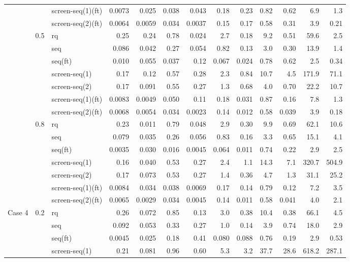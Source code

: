 \begin{longtable}{lllrrrrrrrrrr}
 &  & screen-seq(1)(ft) & 0.0073 & 0.025 & 0.038 & 0.043 & 0.18 & 0.23 & 0.82 & 0.62 & 6.9 & 1.3\\
 &  & screen-seq(2)(ft) & 0.0064 & 0.0059 & 0.034 & 0.0037 & 0.15 & 0.17 & 0.58 & 0.31 & 3.9 & 0.21\\
\midrule
 & 0.5 & rq & 0.25 & 0.24 & 0.78 & 0.024 & 2.7 & 0.18 & 9.2 & 0.51 & 59.6 & 2.5\\
 &  & seq & 0.086 & 0.042 & 0.27 & 0.054 & 0.82 & 0.13 & 3.0 & 0.30 & 13.9 & 1.4\\
 &  & seq(ft) & 0.010 & 0.055 & 0.037 & 0.12 & 0.067 & 0.024 & 0.78 & 0.62 & 2.5 & 0.34\\
 &  & screen-seq(1) & 0.17 & 0.12 & 0.57 & 0.28 & 2.3 & 0.84 & 10.7 & 4.5 & 171.9 & 71.1\\
 &  & screen-seq(2) & 0.17 & 0.091 & 0.55 & 0.27 & 1.3 & 0.68 & 4.0 & 0.70 & 22.2 & 10.7\\
 &  & screen-seq(1)(ft) & 0.0083 & 0.0049 & 0.050 & 0.11 & 0.18 & 0.031 & 0.87 & 0.16 & 7.8 & 1.3\\
 &  & screen-seq(2)(ft) & 0.0068 & 0.0054 & 0.034 & 0.0023 & 0.14 & 0.012 & 0.58 & 0.039 & 3.9 & 0.18\\
\midrule
 & 0.8 & rq & 0.23 & 0.011 & 0.79 & 0.048 & 2.9 & 0.30 & 9.9 & 0.69 & 62.1 & 10.6\\
 &  & seq & 0.079 & 0.035 & 0.26 & 0.056 & 0.83 & 0.16 & 3.3 & 0.65 & 15.1 & 4.1\\
 &  & seq(ft) & 0.0035 & 0.030 & 0.016 & 0.0045 & 0.064 & 0.011 & 0.74 & 0.22 & 2.9 & 2.5\\
 &  & screen-seq(1) & 0.16 & 0.040 & 0.53 & 0.27 & 2.4 & 1.1 & 14.3 & 7.1 & 320.7 & 504.9\\
 &  & screen-seq(2) & 0.17 & 0.073 & 0.53 & 0.27 & 1.4 & 0.36 & 4.7 & 1.3 & 31.1 & 25.2\\
 &  & screen-seq(1)(ft) & 0.0084 & 0.034 & 0.038 & 0.0069 & 0.17 & 0.14 & 0.79 & 0.12 & 7.2 & 3.5\\
 &  & screen-seq(2)(ft) & 0.0065 & 0.0029 & 0.034 & 0.0045 & 0.14 & 0.011 & 0.58 & 0.041 & 4.0 & 2.1\\
\midrule
Case 4 & 0.2 & rq & 0.26 & 0.072 & 0.85 & 0.13 & 3.0 & 0.38 & 10.4 & 0.38 & 66.1 & 4.5\\
 &  & seq & 0.092 & 0.053 & 0.33 & 0.27 & 1.0 & 0.14 & 3.9 & 0.74 & 18.0 & 2.9\\
 &  & seq(ft) & 0.0045 & 0.025 & 0.18 & 0.41 & 0.080 & 0.088 & 0.76 & 0.19 & 2.9 & 0.53\\
 &  & screen-seq(1) & 0.21 & 0.081 & 0.96 & 0.60 & 5.3 & 3.2 & 37.7 & 28.6 & 618.2 & 287.1\\

\end{longtable}
